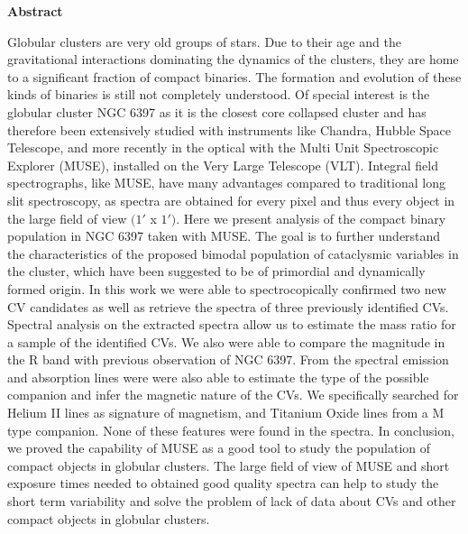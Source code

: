 \thispagestyle{empty}
\begin{Large}
\textbf{Abstract}
\end{Large}
\bigbreak
Globular clusters are very old groups of stars. Due to their age and the gravitational interactions dominating the dynamics of the clusters, they are home to a significant fraction of compact binaries. The formation
and evolution of these kinds of binaries is still not completely understood. Of special interest is the globular cluster NGC 6397 as it is the closest core collapsed cluster and has therefore been extensively studied
with instruments like Chandra, Hubble Space Telescope, and more recently in the optical with the Multi Unit Spectroscopic Explorer (MUSE), installed on the Very Large Telescope (VLT). Integral field spectrographs, like MUSE, have many advantages compared to traditional long slit spectroscopy, as spectra are obtained for every pixel and thus every object in the large field of view $(1'$ x $1')$. Here we present analysis of the compact binary population in NGC 6397 taken with MUSE. The goal is to further understand the characteristics of the proposed bimodal population of cataclysmic variables in the cluster, which have been suggested to be of primordial and dynamically formed origin. In this work we were able to spectrocopically confirmed two new CV candidates as well  as retrieve the spectra of three previously identified CVs. Spectral analysis on the extracted spectra allow us to estimate the mass ratio for a sample of the identified CVs. We also were able to compare the magnitude in the R band with previous observation of NGC 6397. From the spectral emission and absorption lines were were also able to estimate the type of the possible companion and infer the magnetic nature of the CVs. We specifically searched for Helium II lines as signature of magnetism, and Titanium Oxide lines from a M type companion. None of these features were found in the spectra. In conclusion, we proved the capability of MUSE as a good tool to study the population of compact objects in globular clusters. The large field of view of MUSE and short exposure times needed to obtained good quality spectra can help to study the short term variability and solve the problem of lack of data about CVs and other compact objects in globular clusters. 

\clearpage
